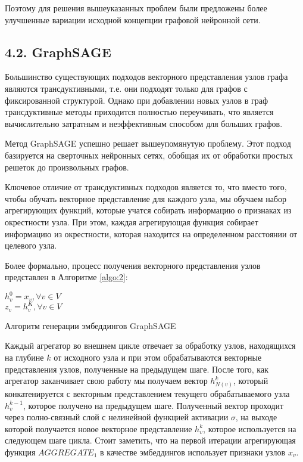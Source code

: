 Поэтому для решения вышеуказанных проблем были предложены более улучшенные вариации исходной концепции графовой нейронной сети. 


\subsection{4.2. GraphSAGE}

Большинство существующих подходов векторного представления узлов графа являются трансдуктивными, т.е. они подходят только для графов с фиксированной структурой. Однако при добавлении новых узлов в граф трансдуктивные методы приходится полностью переучивать, что является вычислительно затратным и неэффективным способом для больших графов.

Метод GraphSAGE \cite{GraphSAGE } успешно решает вышеупомянутую проблему. Этот подход базируется на сверточных нейронных сетях, обобщая их от обработки простых решеток до произвольных графов. 

Ключевое отличие от трансдуктивных подходов является то, что вместо того, чтобы обучать векторное представление для каждого узла, мы обучаем набор агрегирующих функций, которые учатся собирать информацию о признаках из окрестности узла. При этом, каждая агрегирующая функция собирает информацию из окрестности, которая находится на определенном расстоянии от целевого узла. 

Более формально, процесс получения векторного представления узлов представлен в Алгоритме \ref{algo:2}:

\begin{algorithm}[H]
  $ h_v^0 = x_v, \forall v \in V$ \\
  $z_v = h_v^K, \forall v \in V$

    \caption{Алгоритм генерации эмбеддингов GraphSAGE}
    \label{algo:2}
\end{algorithm}

Каждый агрегатор во внешнем цикле отвечает за обработку узлов, находящихся на глубине $k$ от исходного узла и при этом обрабатываются векторные представления узлов, полученные на предыдущем шаге. После того, как агрегатор заканчивает свою работу мы получаем вектор $h_{N(v)}^k$, который конкатенируется с векторным представлением текущего обрабатываемого узла $h_v^{k-1}$, которое получено на предыдущем шаге. Полученный вектор проходит через полно-связный слой с нелинейной функцией активации $\sigma$, на выходе которой получается новое векторное представление $h_v^k$, которое используется на следующем шаге цикла.
Стоит заметить, что на первой итерации агрегирующая функция $AGGREGATE_1$ в качестве эмбеддингов использует признаки узлов $x_v$.  


